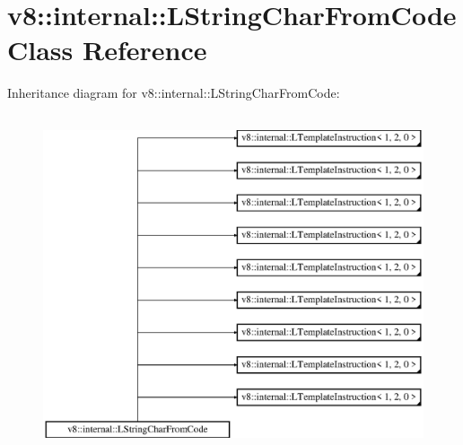 \hypertarget{classv8_1_1internal_1_1_l_string_char_from_code}{}\section{v8\+:\+:internal\+:\+:L\+String\+Char\+From\+Code Class Reference}
\label{classv8_1_1internal_1_1_l_string_char_from_code}
Inheritance diagram for v8\+:\+:internal\+:\+:L\+String\+Char\+From\+Code\+:\begin{figure}[H]
\begin{center}
\leavevmode
\includegraphics[height=10.000000cm]{classv8_1_1internal_1_1_l_string_char_from_code}
\end{center}
\end{figure}

